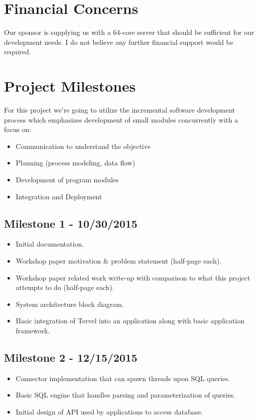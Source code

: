 \documentclass[letterpaper]{article}
\begin{document}
  \section{Financial Concerns}
  Our sponsor is supplying us with a 64-core server that should be sufficient for our development needs. I do not believe any further financial
  support would be required.
  
  \section{Project Milestones}
  For this project we're going to utilize the incremental software development process which emphasizes development of small modules concurrently
  with a focus on:
  \begin{itemize}
   \item Communication to understand the objective
   \item Planning (process modeling, data flow)
   \item Development of program modules
   \item Integration and Deployment
  \end{itemize}
  \subsection{Milestone 1 - 10/30/2015}
  \begin{itemize}
   \item Initial documentation.
   \item Workshop paper motivation \& problem statement (half-page each).
   \item Workshop paper related work write-up with comparison to what this project attempts to do (half-page each).
   \item System architecture block diagram.
   \item Basic integration of Tervel into an application along with basic application framework.
  \end{itemize}
  \subsection{Milestone 2 - 12/15/2015}
  \begin{itemize}
   \item Connector implementation that can spawn threads upon SQL queries.
   \item Basic SQL engine that handles parsing and parameterization of queries.
   \item Initial design of API used by applications to access database.
  \end{itemize}
\end{document}
